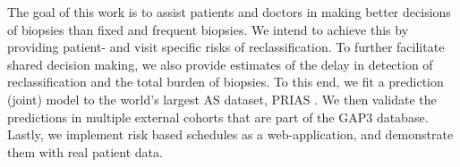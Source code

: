 The goal of this work is to assist patients and doctors in making better decisions of biopsies than fixed and frequent biopsies. We intend to achieve this by providing patient- and visit specific risks of reclassification. To further facilitate shared decision making, we also provide estimates of the delay in detection of reclassification and the total burden of biopsies. To this end, we fit a prediction (joint) model to the world's largest AS dataset, PRIAS \citep{bul2013active}. We then validate the predictions in multiple external cohorts that are part of the GAP3 database. Lastly, we implement risk based schedules as a web-application, and demonstrate them with real patient data.